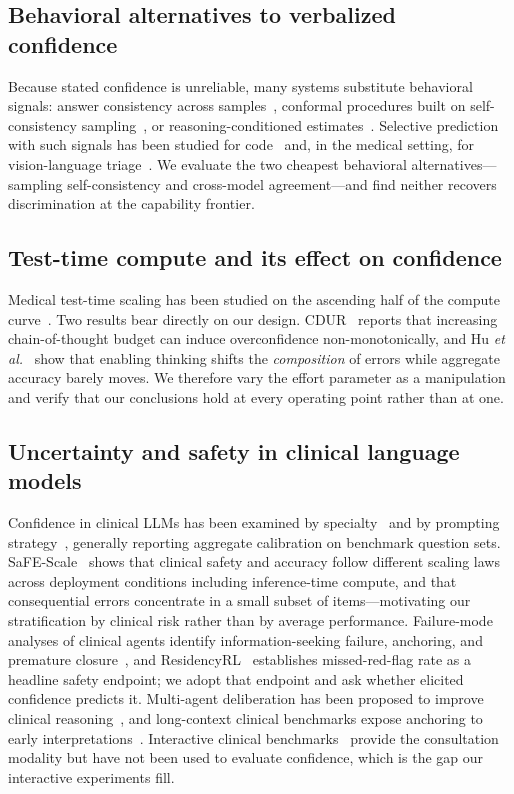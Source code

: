 \documentclass[journal,twoside]{IEEEtran}
\begin{document}
\subsection{Behavioral alternatives to verbalized confidence}
Because stated confidence is unreliable, many systems substitute behavioral signals: answer
consistency across samples~\cite{trac2026}, conformal procedures built on self-consistency
sampling~\cite{conformal2026}, or reasoning-conditioned estimates~\cite{cdur2026}. Selective
prediction with such signals has been studied for code~\cite{sqlsel2026} and, in the medical
setting, for vision-language triage~\cite{triage2026}. We evaluate the two cheapest behavioral
alternatives---sampling self-consistency and cross-model agreement---and find neither recovers
discrimination at the capability frontier.

\subsection{Test-time compute and its effect on confidence}
Medical test-time scaling has been studied on the ascending half of the compute
curve~\cite{m1_2025,ttsmed2025}. Two results bear directly on our design. CDUR~\cite{cdur2026}
reports that increasing chain-of-thought budget can induce overconfidence non-monotonically, and
Hu \emph{et al.}~\cite{thinkshift2026} show that enabling thinking shifts the \emph{composition} of
errors while aggregate accuracy barely moves. We therefore vary the effort parameter as a
manipulation and verify that our conclusions hold at every operating point rather than at one.

\subsection{Uncertainty and safety in clinical language models}
Confidence in clinical LLMs has been examined by specialty~\cite{gastro2025} and by prompting
strategy~\cite{promptmed2025}, generally reporting aggregate calibration on benchmark question sets.
SaFE-Scale~\cite{safescale2026} shows that clinical safety and accuracy follow different scaling
laws across deployment conditions including inference-time compute, and that consequential errors
concentrate in a small subset of items---motivating our stratification by clinical risk rather than
by average performance. Failure-mode analyses of clinical agents identify information-seeking
failure, anchoring, and premature closure~\cite{infoseek2026,premature2026,clinmm2026}, and
ResidencyRL~\cite{residency2026} establishes missed-red-flag rate as a headline safety endpoint; we
adopt that endpoint and ask whether elicited confidence predicts it. Multi-agent deliberation has
been proposed to improve clinical reasoning~\cite{ophtha2026,drl2026}, and long-context clinical
benchmarks expose anchoring to early interpretations~\cite{realicu2026}. Interactive clinical
benchmarks~\cite{agentclinic} provide the consultation modality but have not been used to evaluate
confidence, which is the gap our interactive experiments fill.
\end{document}
